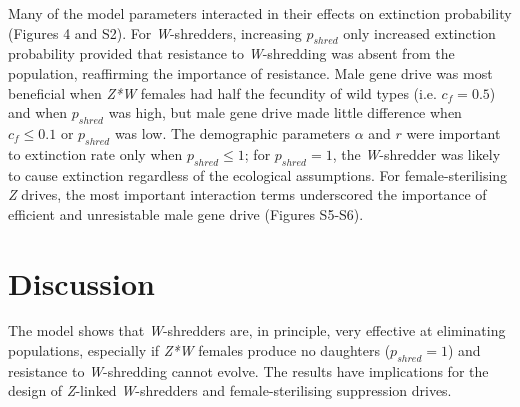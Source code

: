\documentclass[]{rsos}%
\begin{document}
Many of the model parameters interacted in their effects on extinction
probability (Figures 4 and S2). For \emph{W}-shredders, increasing
\(p_{shred}\) only increased extinction probability provided that
resistance to \emph{W}-shredding was absent from the population,
reaffirming the importance of resistance. Male gene drive was most
beneficial when \emph{Z*W} females had half the fecundity of wild types
(i.e. \(c_f = 0.5\)) and when \(p_{shred}\) was high, but male gene
drive made little difference when \(c_f \le 0.1\) or \(p_{shred}\) was
low. The demographic parameters \(\alpha\) and \(r\) were important to
extinction rate only when \(p_{shred} \le 1\); for \(p_{shred} = 1\),
the \emph{W}-shredder was likely to cause extinction regardless of the
ecological assumptions. For female-sterilising \emph{Z} drives, the most
important interaction terms underscored the importance of efficient and
unresistable male gene drive (Figures S5-S6).

\hypertarget{discussion}{%
\section{Discussion}\label{discussion}}

The model shows that \emph{W}-shredders are, in principle, very
effective at eliminating populations, especially if \emph{Z*W} females
produce no daughters (\(p_{shred} = 1\)) and resistance to
\emph{W}-shredding cannot evolve. The results have implications for the
design of \emph{Z}-linked \emph{W}-shredders and female-sterilising
suppression drives.
\end{document}
